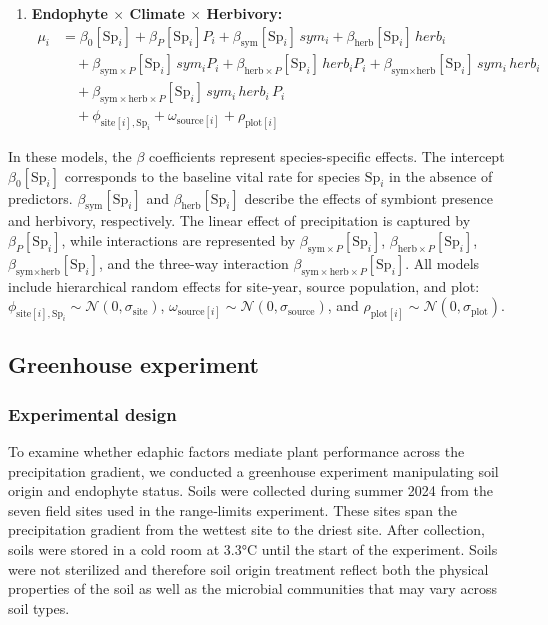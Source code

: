 \documentclass[12pt]{article}\usepackage[]{graphicx}\usepackage[dvipsnames]{xcolor}
\begin{document}
{\begin{enumerate}
    \item \textbf{Endophyte $\times$ Climate $\times$ Herbivory:}
    \begin{align*}
    \mu_i &= \beta_0[\text{Sp}_i] + \beta_P[\text{Sp}_i] P_i
            + \beta_{\text{sym}}[\text{Sp}_i]\,sym_i
            + \beta_{\text{herb}}[\text{Sp}_i]\,herb_i \\
    &\quad + \beta_{\text{sym}\times P}[\text{Sp}_i]\,sym_i P_i
            + \beta_{\text{herb}\times P}[\text{Sp}_i]\,herb_i P_i
            + \beta_{\text{sym}\times \text{herb}}[\text{Sp}_i]\,sym_i\,herb_i \\
    &\quad + \beta_{\text{sym}\times \text{herb} \times P}[\text{Sp}_i]\,sym_i\,herb_i\,P_i \\
    &\quad + \phi_{\text{site}[i],\text{Sp}_i} + \omega_{\text{source}[i]} + \rho_{\text{plot}[i]}
    \end{align*}
\end{enumerate}
In these models, the $\beta$ coefficients represent species-specific effects.
The intercept $\beta_0[\text{Sp}_i]$ corresponds to the baseline vital rate for species $\text{Sp}_i$ in the absence of predictors.
$\beta_{\text{sym}}[\text{Sp}_i]$ and $\beta_{\text{herb}}[\text{Sp}_i]$ describe the effects of symbiont presence and herbivory, respectively.
The linear effect of precipitation is captured by $\beta_P[\text{Sp}_i]$, while interactions are represented by $\beta_{\text{sym}\times P}[\text{Sp}_i]$, $\beta_{\text{herb}\times P}[\text{Sp}_i]$,
$\beta_{\text{sym}\times \text{herb}}[\text{Sp}_i]$, and the three-way interaction $\beta_{\text{sym}\times \text{herb} \times P}[\text{Sp}_i]$.
All models include hierarchical random effects for site-year, source population, and plot: $\phi_{\text{site}[i],\text{Sp}_i} \sim \mathcal{N}(0, \sigma_{\text{site}})$, $\omega_{\text{source}[i]} \sim \mathcal{N}(0, \sigma_{\text{source}})$,
and $\rho_{\text{plot}[i]} \sim \mathcal{N}(0, \sigma_{\text{plot}})$.

\subsection*{Greenhouse experiment}
\label{sec:greenhouse}

\subsubsection*{Experimental design}

To examine whether edaphic factors mediate plant performance across the precipitation gradient, we conducted a greenhouse experiment
manipulating soil origin and endophyte status.
Soils were collected during summer 2024 from the seven field sites used in the range‐limits experiment.
These sites span the precipitation gradient from the wettest site to the driest site. 
After collection, soils were stored in a cold room at 3.3°C until the start of the experiment. 
Soils were not sterilized and therefore soil origin treatment reflect both the physical properties of the soil as well as the microbial communities that may vary across soil types.

}
\end{document}
